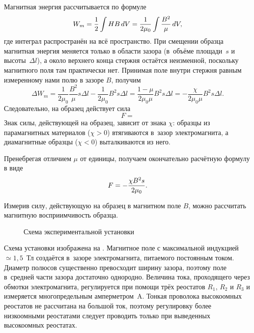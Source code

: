 Магнитная энергия рассчитывается по формуле
\begin{equation}%
	\eqmark{energy}
	W_m=\frac12\int H B\,dV=\frac{1}{2\mu_0}\int\frac{B^2}{\mu}\,dV,
\end{equation}
где интеграл распространён на всё пространство. При смещении образца магнитная энергия меняется только в области зазора
(в~объёме площади~$s$ и высоты~$\Delta l$), а около верхнего конца стержня остаётся неизменной, поскольку магнитного поля там
практически нет. Принимая поле внутри стержня равным измеренному нами полю в зазоре $B$, получим
\begin{equation*}
	\Delta W_m=\frac{1}{2\mu_0}\frac{B^2}{\mu}s\Delta l-\frac{1}{2\mu_0}B^2 s\Delta l=\frac{1-\mu}{2\mu_0\mu}B^2s\Delta
	l=-\frac{\chi}{2\mu_0\mu}B^2s\Delta l.
\end{equation*}
Следовательно, на образец действует сила
\begin{equation}%
	F=%
\end{equation}
Знак силы, действующей на образец, зависит от знака $\chi$: образцы из парамагнитных материалов ($\chi>0$) втягиваются
в~зазор электромагнита, а диамагнитные образцы ($\chi<0$) выталкиваются  из него.

Пренебрегая отличием $\mu$ от единицы, получаем окончательно расчётную формулу в виде
\begin{equation}%
	\eqmark{final}
	F=-\frac{\chi B^2s}{2\mu_0}.
\end{equation}

Измерив силу, действующую на образец в магнитном поле $B$, можно рассчитать магнитную восприимчивость образца.

\begin{figure}%
	\caption{Схема экспериментальной установки}
\end{figure}


\experiment

Схема установки изображена на . Магнитное поле с максимальной индукцией~${\simeq}1,5$~Тл создаётся в~зазоре
электромагнита, питаемого постоянным током. Диаметр полюсов существенно превосходит ширину зазора, поэтому поле
в~средней части зазора достаточно однородно. Величина тока, проходящего через обмотки электромагнита, регулируется при
помощи трёх реостатов $R_1$, $R_2$ и $R_3$ и измеряется многопредельным амперметром~A. Тонкая проволока высокоомных
реостатов не рассчитана на большой ток, поэтому регулировку более низкоомными реостатами следует проводить только при
 выведенных высокоомных реостатах.

